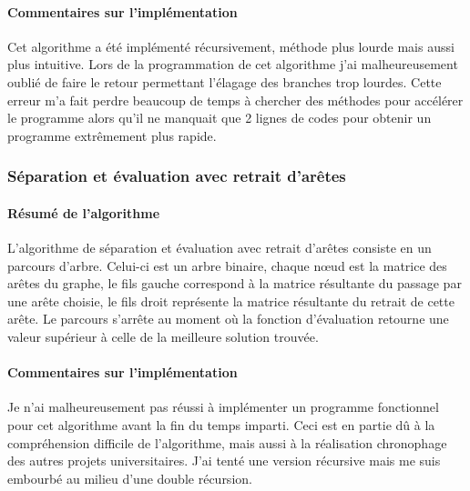 \documentclass[10pt,a4paper]{report}
\begin{document}
		\paragraph{Commentaires sur l'implémentation\\}
		\begin{flushleft}
	Cet algorithme a été implémenté récursivement, méthode plus lourde mais aussi plus intuitive.
	Lors de la programmation de cet algorithme j'ai malheureusement oublié de faire le retour permettant l'élagage des branches trop lourdes. Cette erreur m'a fait perdre beaucoup de temps à chercher des méthodes pour accélérer le programme alors qu'il ne manquait que 2 lignes de codes pour obtenir un programme extrêmement plus rapide.
		\end{flushleft}
	
		\subsubsection{Séparation et évaluation avec retrait d'arêtes}		
		
		\paragraph{Résumé de l'algorithme\\}
		\begin{flushleft}
		L'algorithme de séparation et évaluation avec retrait d'arêtes consiste en un parcours d'arbre. Celui-ci est un arbre binaire, chaque nœud est la matrice des arêtes du graphe, le fils gauche correspond à la matrice résultante du passage par une arête choisie, le fils droit représente la matrice résultante du retrait de cette arête. Le parcours s'arrête au moment où la fonction d'évaluation retourne une valeur supérieur à celle de la meilleure solution trouvée.\\
		\end{flushleft}
		
		\paragraph{Commentaires sur l'implémentation\\}
		\begin{flushleft}
		Je n'ai malheureusement pas réussi à implémenter un programme fonctionnel pour cet algorithme avant la fin du temps imparti. Ceci est en partie dû à la compréhension difficile de l'algorithme, mais aussi à la réalisation chronophage des autres projets universitaires.
		J'ai tenté une version récursive mais me suis embourbé au milieu d'une double récursion.
		\end{flushleft}
		
\end{document}
